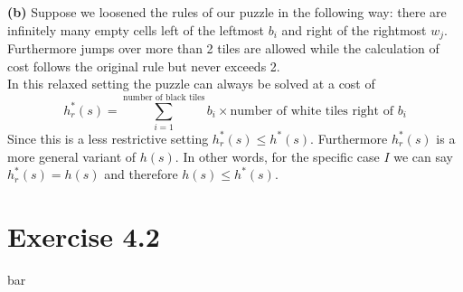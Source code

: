\documentclass[11pt,a4paper]{article}
\begin{document}
\textbf{(b)} Suppose we loosened the rules of our puzzle in the following way: there are infinitely many empty cells left of the leftmost $b_i$ and right of the rightmost $w_j$. Furthermore jumps over more than 2 tiles are allowed while the calculation of cost follows the original rule but never exceeds 2.\\
In this relaxed setting the puzzle can always be solved at a cost of\\
\begin{equation*}
h_r^*(s) = \sum_{i=1}^{\text{number of black tiles}} b_i\times \text{number of white tiles right of }b_i
\end{equation*}
Since this is a less restrictive setting $h_r^*(s)\leq h^*(s)$. Furthermore $h_r^*(s)$ is a more general variant of $h(s)$. In other words, for the specific case $I$ we can say $h_r^*(s)=h(s)$ and therefore $h(s)\leq h^*(s)$.

\section*{Exercise 4.2}
bar
\end{document}
